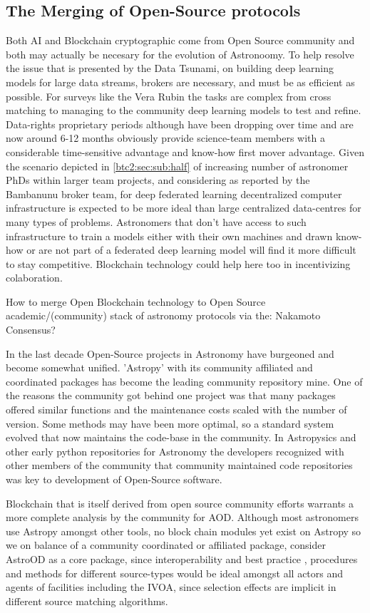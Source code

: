 \documentclass[final,5p,times,twocolumn,authoryear]{elsarticle}
\begin{document}
\subsection{The Merging of Open-Source protocols}

Both AI and Blockchain cryptographic come from Open Source community and both may actually be necesary for the evolution of Astronoomy. To help resolve the issue that is presented by the Data Tsunami, on building deep learning models for large data streams, brokers are necessary, and must be as efficient as possible. For surveys like the Vera Rubin the tasks are complex from cross matching to managing to the community deep learning models to test and refine. Data-rights proprietary periods although have been dropping over time and are now around 6-12 months obviously provide science-team members with a considerable time-sensitive advantage and know-how first mover advantage.  Given the scenario depicted in \ref{btc2:sec:sub:half} of increasing number of astronomer PhDs within larger team projects, and considering as reported by the Bambanunu broker team, for deep federated learning decentralized computer infrastructure is expected to be more ideal than large centralized data-centres for many types of problems.  Astronomers that don't have access to such infrastructure to train a models either with their own machines and drawn know-how or are not part of a federated deep learning model will find it more difficult to stay competitive. Blockchain technology could help here too in incentivizing colaboration.   

How to merge Open Blockchain technology to Open Source academic/(community) stack of astronomy protocols via the: Nakamoto Consensus?

In the last decade Open-Source projects in Astronomy have burgeoned and become somewhat unified. 'Astropy' with its community affiliated and coordinated packages has become the leading community repository mine.  One of the reasons the community got behind one project was that many packages offered similar functions and the maintenance costs scaled with the number of version. Some methods may have been more optimal, so a standard system evolved that now maintains the code-base in the community. In Astropysics and other early python repositories for Astronomy the developers recognized with other members of the community that community maintained code repositories was key to development of Open-Source software.

Blockchain that is itself derived from open source community efforts warrants a more complete analysis by the community for AOD. Although most astronomers use Astropy amongst other tools, no block chain modules yet exist on Astropy so we on balance of a community coordinated or affiliated package, consider AstroOD as a core package, since interoperability and best practice , procedures and methods for different source-types would be ideal amongst all actors and agents of facilities including the IVOA, since selection effects are implicit in different source matching algorithms.
\end{document}
